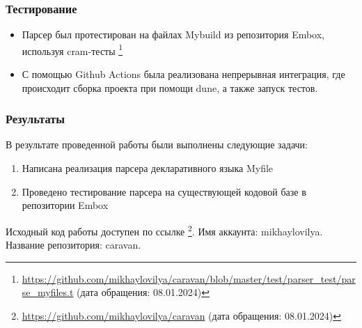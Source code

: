 \documentclass{beamer}
\begin{document}
\begin{frame}
	\frametitle{Тестирование}
	\begin{itemize}
		\item Парсер был протестирован на файлах Mybuild из репозитория Embox, используя cram-тесты \footnote{\href{https://github.com/mikhaylovilya/caravan/blob/master/test/parser\_test/parse\_myfiles.t}{https://github.com/mikhaylovilya/caravan/blob/master/test/parser\_test/parse\_myfiles.t} (дата обращения: 08.01.2024)}
		\item С помощью Github Actions была реализована непрерывная интеграция, где происходит сборка проекта при помощи dune, а также запуск тестов.
	\end{itemize}
\end{frame}

\begin{frame}
	\frametitle{Результаты}
	В результате проведенной работы были выполнены следующие задачи:
	\begin{enumerate}
		\item Написана реализация парсера декларативного языка Myfile
		\item Проведено тестирование парсера на существующей кодовой базе в репозитории Embox
	\end{enumerate}

	Исходный код работы доступен по ссылке \footnote{\href{https://github.com/mikhaylovilya/caravan}{https://github.com/mikhaylovilya/caravan} (дата обращения: 08.01.2024)}.
	Имя аккаунта: mikhaylovilya. Название репозитория: caravan.
\end{frame}

\appendix
\end{document}
